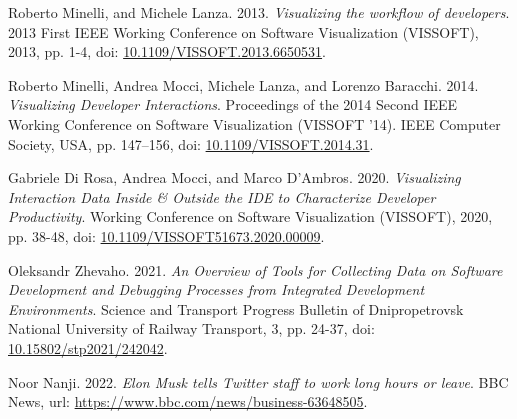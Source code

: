 \begin{thebibliography}{99}
 Roberto Minelli, and Michele Lanza. 2013. \textit{Visualizing the workflow of developers}. 2013 First IEEE Working Conference on Software Visualization (VISSOFT), 2013, pp. 1-4, doi: \href{https://doi.org/10.1109/VISSOFT.2013.6650531}{10.1109/VISSOFT.2013.6650531}.

 Roberto Minelli, Andrea Mocci, Michele Lanza, and Lorenzo Baracchi. 2014. \textit{Visualizing Developer Interactions}. Proceedings of the 2014 Second IEEE Working Conference on Software Visualization (VISSOFT '14). IEEE Computer Society, USA, pp. 147–156, doi: \href{https://doi.org/10.1109/VISSOFT.2014.31}{10.1109/VISSOFT.2014.31}.

 Gabriele Di Rosa, Andrea Mocci, and Marco D’Ambros. 2020. \textit{Visualizing Interaction Data Inside \& Outside the IDE to Characterize Developer Productivity}. Working Conference on Software Visualization (VISSOFT), 2020, pp. 38-48, doi: \href{https://doi.org/10.1109/VISSOFT51673.2020.00009}{10.1109/VISSOFT51673.2020.00009}.

 Oleksandr Zhevaho. 2021. \textit{An Overview of Tools for Collecting Data on Software Development and Debugging Processes from Integrated Development Environments}. Science and Transport Progress Bulletin of Dnipropetrovsk National University of Railway Transport, 3, pp. 24-37, doi: \href{https://doi.org/10.15802/stp2021/242042}{10.15802/stp2021/242042}.

 Noor Nanji. 2022. \textit{Elon Musk tells Twitter staff to work long hours or leave}. BBC News, url: \url{https://www.bbc.com/news/business-63648505}.

\end{thebibliography}
